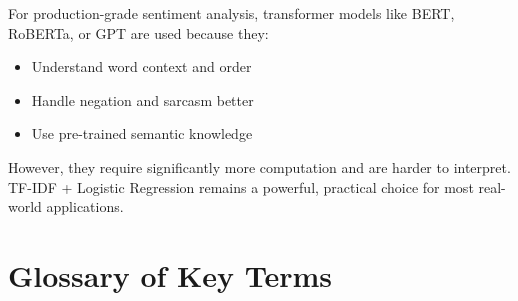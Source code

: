 \documentclass[12pt, a4paper]{article}
\begin{document}
For production-grade sentiment analysis, transformer models like BERT, RoBERTa, or GPT are used because they:
\begin{itemize}
  \item Understand word context and order
  \item Handle negation and sarcasm better
  \item Use pre-trained semantic knowledge
\end{itemize}

However, they require significantly more computation and are harder to interpret. TF-IDF + Logistic Regression remains a powerful, practical choice for most real-world applications.

\newpage

\section{Glossary of Key Terms}
\end{document}
